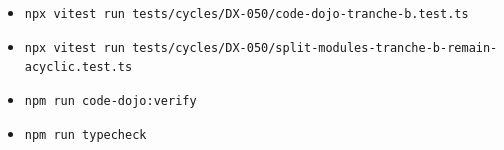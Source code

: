 \begin{itemize}
\tightlist
\item
  \texttt{n\allowbreak{}p\allowbreak{}x\allowbreak{} \allowbreak{}v\allowbreak{}i\allowbreak{}t\allowbreak{}e\allowbreak{}s\allowbreak{}t\allowbreak{} \allowbreak{}r\allowbreak{}u\allowbreak{}n\allowbreak{} \allowbreak{}t\allowbreak{}e\allowbreak{}s\allowbreak{}t\allowbreak{}s\allowbreak{}/\allowbreak{}c\allowbreak{}y\allowbreak{}c\allowbreak{}l\allowbreak{}e\allowbreak{}s\allowbreak{}/\allowbreak{}D\allowbreak{}X\allowbreak{}-\allowbreak{}0\allowbreak{}5\allowbreak{}0\allowbreak{}/\allowbreak{}c\allowbreak{}o\allowbreak{}d\allowbreak{}e\allowbreak{}-\allowbreak{}d\allowbreak{}o\allowbreak{}j\allowbreak{}o\allowbreak{}-\allowbreak{}t\allowbreak{}r\allowbreak{}a\allowbreak{}n\allowbreak{}c\allowbreak{}h\allowbreak{}e\allowbreak{}-\allowbreak{}b\allowbreak{}.\allowbreak{}t\allowbreak{}e\allowbreak{}s\allowbreak{}t\allowbreak{}.\allowbreak{}t\allowbreak{}s}
\item
  \texttt{n\allowbreak{}p\allowbreak{}x\allowbreak{} \allowbreak{}v\allowbreak{}i\allowbreak{}t\allowbreak{}e\allowbreak{}s\allowbreak{}t\allowbreak{} \allowbreak{}r\allowbreak{}u\allowbreak{}n\allowbreak{} \allowbreak{}t\allowbreak{}e\allowbreak{}s\allowbreak{}t\allowbreak{}s\allowbreak{}/\allowbreak{}c\allowbreak{}y\allowbreak{}c\allowbreak{}l\allowbreak{}e\allowbreak{}s\allowbreak{}/\allowbreak{}D\allowbreak{}X\allowbreak{}-\allowbreak{}0\allowbreak{}5\allowbreak{}0\allowbreak{}/\allowbreak{}s\allowbreak{}p\allowbreak{}l\allowbreak{}i\allowbreak{}t\allowbreak{}-\allowbreak{}m\allowbreak{}o\allowbreak{}d\allowbreak{}u\allowbreak{}l\allowbreak{}e\allowbreak{}s\allowbreak{}-\allowbreak{}t\allowbreak{}r\allowbreak{}a\allowbreak{}n\allowbreak{}c\allowbreak{}h\allowbreak{}e\allowbreak{}-\allowbreak{}b\allowbreak{}-\allowbreak{}r\allowbreak{}e\allowbreak{}m\allowbreak{}a\allowbreak{}i\allowbreak{}n\allowbreak{}-\allowbreak{}a\allowbreak{}c\allowbreak{}y\allowbreak{}c\allowbreak{}l\allowbreak{}i\allowbreak{}c\allowbreak{}.\allowbreak{}t\allowbreak{}e\allowbreak{}s\allowbreak{}t\allowbreak{}.\allowbreak{}t\allowbreak{}s}
\item
  \texttt{n\allowbreak{}p\allowbreak{}m\allowbreak{} \allowbreak{}r\allowbreak{}u\allowbreak{}n\allowbreak{} \allowbreak{}c\allowbreak{}o\allowbreak{}d\allowbreak{}e\allowbreak{}-\allowbreak{}d\allowbreak{}o\allowbreak{}j\allowbreak{}o\allowbreak{}:\allowbreak{}v\allowbreak{}e\allowbreak{}r\allowbreak{}i\allowbreak{}f\allowbreak{}y}
\item
  \texttt{n\allowbreak{}p\allowbreak{}m\allowbreak{} \allowbreak{}r\allowbreak{}u\allowbreak{}n\allowbreak{} \allowbreak{}t\allowbreak{}y\allowbreak{}p\allowbreak{}e\allowbreak{}c\allowbreak{}h\allowbreak{}e\allowbreak{}c\allowbreak{}k}

\end{itemize}
